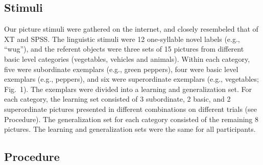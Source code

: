 \documentclass[english,floatsintext,man]{apa6}
\theoremstyle{definition}
\theoremstyle{definition}
\theoremstyle{remark}
\begin{document}
\subsection{Stimuli}\label{stimuli}

Our picture stimuli were gathered on the internet, and closely
resembeled that of XT and SPSS. The linguistic stimuli were 12
one-syllable novel labels (e.g., \enquote{wug}), and the referent
objects were three sets of 15 pictures from different basic level
categories (vegetables, vehicles and animals). Within each category,
five were subordinate exemplars (e.g., green peppers), four were basic
level exemplars (e.g., peppers), and six were superordinate exemplars
(e.g., vegetables; Fig.~1). The exemplars were divided into a learning
and generalization set. For each category, the learning set consisted of
3 subordinate, 2 basic, and 2 superordinate pictures presented in
different combinations on different trials (see Procedure). The
generalization set for each category consisted of the remaining 8
pictures. The learning and generalization sets were the same for all
participants.

\subsection{Procedure}\label{procedure}
\end{document}
